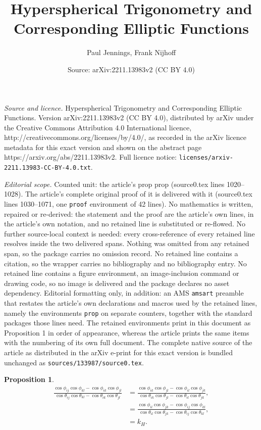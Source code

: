 \documentclass[10pt,a4paper]{amsart}
\title{Hyperspherical Trigonometry and Corresponding Elliptic Functions}
\author{Paul Jennings, Frank Nijhoff}
\date{Source: arXiv:2211.13983v2 (CC BY 4.0)}
\newtheorem{prop}{Proposition}
\begin{document}
\maketitle

\noindent\emph{Source and licence.} Hyperspherical Trigonometry and Corresponding Elliptic Functions. Version arXiv:2211.13983v2 (CC BY 4.0), distributed by arXiv under the Creative Commons Attribution 4.0 International licence, http://creativecommons.org/licenses/by/4.0/, as recorded in the arXiv licence metadata for this exact version and shown on the abstract page https://arxiv.org/abs/2211.13983v2. Full licence notice: \texttt{licenses/arxiv-2211.13983-CC-BY-4.0.txt}.\par\smallskip

\noindent\textit{Editorial scope.} Counted unit: the article's prop prop (source0.tex lines 1020--1028). The article's complete original proof of it is delivered with it (source0.tex lines 1030--1071, one \texttt{proof} environment of 42 lines). No mathematics is written, repaired or re-derived: the statement and the proof are the article's own lines, in the article's own notation, and no retained line is substituted or re-flowed.  No further source-local context is needed: every cross-reference of every retained line resolves inside the two delivered spans.  Nothing was omitted from any retained span, so the package carries no omission record.  No retained line contains a citation, so the wrapper carries no bibliography and no bibliography entry.  No retained line contains a figure environment, an image-inclusion command or drawing code, so no image is delivered and the package declares no asset dependency.  Editorial formatting only, in addition: an AMS \texttt{amsart} preamble that restates the article's own declarations and macros used by the retained lines, namely the environments \texttt{prop} on separate counters, together with the standard packages those lines need.  The retained environments print in this document as Proposition 1 in order of appearance, whereas the article prints the same items with the numbering of its own full document.  The complete native source of the article as distributed in the arXiv e-print for this exact version is bundled unchanged as \texttt{sources/133987/source0.tex}.
\begin{prop}
\begin{equation}
\begin{split}
\frac{\cos\phi_{ij}\cos\phi_{kl}-\cos\phi_{ik}\cos\phi_{jl}}{\cos\theta_{ij}\cos\theta_{kl}-\cos\theta_{ik}\cos\theta_{jl}}&=\frac{\cos\phi_{ik}\cos\phi_{jl}-\cos\phi_{il}\cos\phi_{jk}}{\cos\theta_{ik}\cos\theta_{jl}-\cos\theta_{il}\cos\theta_{jk}},\\
&=\frac{\cos\phi_{il}\cos\phi_{jk}-\cos\phi_{ij}\cos\phi_{kl}}{\cos\theta_{il}\cos\theta_{jk}-\cos\theta_{ij}\cos\theta_{kl}},\\
&=k_H.
\end{split}
\end{equation}
\end{prop}
\end{document}
